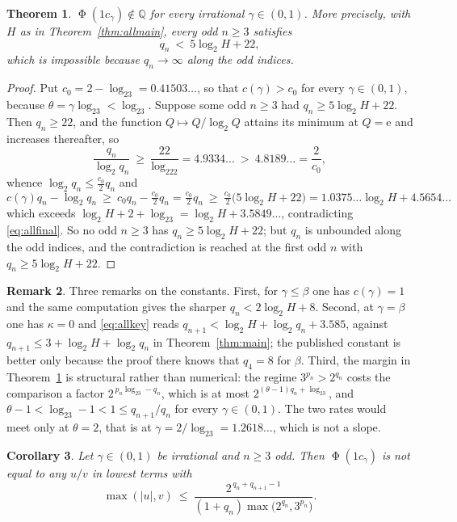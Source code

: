 \documentclass[11pt,reqno]{amsart}
\theoremstyle{plain}
\newtheorem{theorem}{Theorem}[section]
\newtheorem{corollary}[theorem]{Corollary}
\theoremstyle{definition}
\newtheorem{remark}[theorem]{Remark}
\newcommand{\Q}{\mathbb{Q}}
\DeclareMathOperator{\Ph}{\Phi}
\begin{document}
\begin{theorem}\label{thm:allslopes}
$\Ph(1c_\gamma)\notin\Q$ for every irrational $\gamma\in(0,1)$. More precisely,
with $H$ as in Theorem~\ref{thm:allmain}, every odd $n\ge3$ satisfies
\begin{equation}\label{eq:allfire}
q_n\ <\ 5\log_2H+22 ,
\end{equation}
which is impossible because $q_n\to\infty$ along the odd indices.
\end{theorem}

\begin{proof}
Put $c_0=2-\log_23=0.41503\ldots$, so that $c(\gamma)>c_0$ for every
$\gamma\in(0,1)$, because $\theta=\gamma\log_23<\log_23$. Suppose some odd
$n\ge3$ had $q_n\ge5\log_2H+22$. Then $q_n\ge22$, and the function
$Q\mapsto Q/\log_2Q$ attains its minimum at $Q=\mathrm e$ and increases
thereafter, so
\[
\frac{q_n}{\log_2q_n}\ \ge\ \frac{22}{\log_222}=4.9334\ldots\ >\ 4.8189\ldots=\frac{2}{c_0},
\]
whence $\log_2q_n\le\tfrac{c_0}{2}q_n$ and
\[
c(\gamma)q_n-\log_2q_n\ \ge\ c_0q_n-\tfrac{c_0}{2}q_n=\tfrac{c_0}{2}q_n
\ \ge\ \tfrac{c_0}{2}\bigl(5\log_2H+22\bigr)
=1.0375\ldots\log_2H+4.5654\ldots
\]
which exceeds $\log_2H+2+\log_23=\log_2H+3.5849\ldots$, contradicting
\eqref{eq:allfinal}. So no odd $n\ge3$ has $q_n\ge5\log_2H+22$; but $q_n$ is
unbounded along the odd indices, and the contradiction is reached at the first
odd $n$ with $q_n\ge5\log_2H+22$.
\end{proof}

\begin{remark}
Three remarks on the constants. First, for $\gamma\le\beta$ one has
$c(\gamma)=1$ and the same computation gives the sharper
$q_n<2\log_2H+8$. Second, at $\gamma=\beta$ one has $\kappa=0$ and
\eqref{eq:allkey} reads $q_{n+1}<\log_2H+\log_2q_n+3.585$, against
$q_{n+1}\le3+\log_2H+\log_2q_n$ in Theorem~\ref{thm:main}; the published
constant is better only because the proof there knows that $q_4=8$ for $\beta$.
Third, the margin in Theorem~\ref{thm:allslopes} is structural rather than
numerical: the regime $3^{p_n}>2^{q_n}$ costs the comparison a factor
$2^{\,p_n\log_23-q_n}$, which is at most $2^{(\theta-1)q_n+\log_23}$, and
$\theta-1<\log_23-1<1\le q_{n+1}/q_n$ for every $\gamma\in(0,1)$. The two rates would meet only at $\theta=2$, that is at
$\gamma=2/\log_23=1.2618\ldots$, which is not a slope.
\end{remark}

\begin{corollary}\label{cor:allshadow}
Let $\gamma\in(0,1)$ be irrational and $n\ge3$ odd. Then $\Ph(1c_\gamma)$ is not
equal to any $u/v$ in lowest terms with
\[
\max(|u|,v)\ \le\ \frac{2^{\,q_n+q_{n+1}-1}}{(1+q_n)\max\bigl(2^{q_n},3^{p_n}\bigr)} .
\]
\end{corollary}
\end{document}
